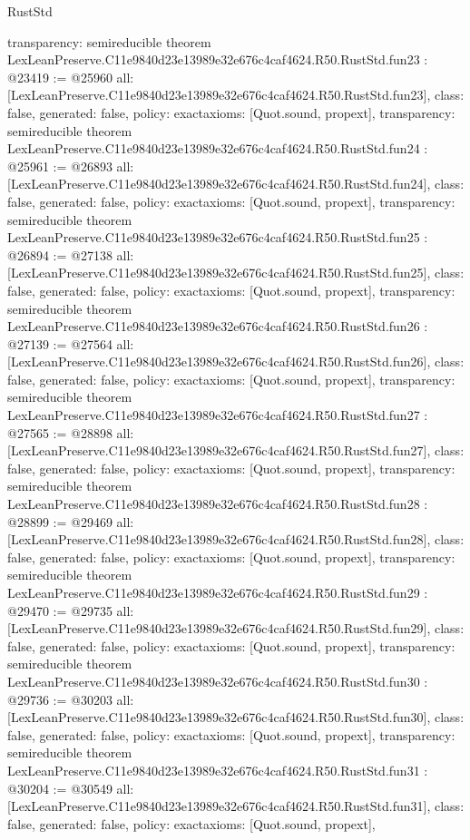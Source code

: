 \begin{lexlean}{RustStd}
\begin{coremodule}
{  transparency: semireducible
}
theorem LexLeanPreserve.C11e9840d23e13989e32e676c4caf4624.R50.RustStd.fun23 : @23419 := @25960 {
  all: [LexLeanPreserve.C11e9840d23e13989e32e676c4caf4624.R50.RustStd.fun23],
  class: false,
  generated: false,
  policy: exact{axioms: [Quot.sound, propext]},
  transparency: semireducible
}
theorem LexLeanPreserve.C11e9840d23e13989e32e676c4caf4624.R50.RustStd.fun24 : @25961 := @26893 {
  all: [LexLeanPreserve.C11e9840d23e13989e32e676c4caf4624.R50.RustStd.fun24],
  class: false,
  generated: false,
  policy: exact{axioms: [Quot.sound, propext]},
  transparency: semireducible
}
theorem LexLeanPreserve.C11e9840d23e13989e32e676c4caf4624.R50.RustStd.fun25 : @26894 := @27138 {
  all: [LexLeanPreserve.C11e9840d23e13989e32e676c4caf4624.R50.RustStd.fun25],
  class: false,
  generated: false,
  policy: exact{axioms: [Quot.sound, propext]},
  transparency: semireducible
}
theorem LexLeanPreserve.C11e9840d23e13989e32e676c4caf4624.R50.RustStd.fun26 : @27139 := @27564 {
  all: [LexLeanPreserve.C11e9840d23e13989e32e676c4caf4624.R50.RustStd.fun26],
  class: false,
  generated: false,
  policy: exact{axioms: [Quot.sound, propext]},
  transparency: semireducible
}
theorem LexLeanPreserve.C11e9840d23e13989e32e676c4caf4624.R50.RustStd.fun27 : @27565 := @28898 {
  all: [LexLeanPreserve.C11e9840d23e13989e32e676c4caf4624.R50.RustStd.fun27],
  class: false,
  generated: false,
  policy: exact{axioms: [Quot.sound, propext]},
  transparency: semireducible
}
theorem LexLeanPreserve.C11e9840d23e13989e32e676c4caf4624.R50.RustStd.fun28 : @28899 := @29469 {
  all: [LexLeanPreserve.C11e9840d23e13989e32e676c4caf4624.R50.RustStd.fun28],
  class: false,
  generated: false,
  policy: exact{axioms: [Quot.sound, propext]},
  transparency: semireducible
}
theorem LexLeanPreserve.C11e9840d23e13989e32e676c4caf4624.R50.RustStd.fun29 : @29470 := @29735 {
  all: [LexLeanPreserve.C11e9840d23e13989e32e676c4caf4624.R50.RustStd.fun29],
  class: false,
  generated: false,
  policy: exact{axioms: [Quot.sound, propext]},
  transparency: semireducible
}
theorem LexLeanPreserve.C11e9840d23e13989e32e676c4caf4624.R50.RustStd.fun30 : @29736 := @30203 {
  all: [LexLeanPreserve.C11e9840d23e13989e32e676c4caf4624.R50.RustStd.fun30],
  class: false,
  generated: false,
  policy: exact{axioms: [Quot.sound, propext]},
  transparency: semireducible
}
theorem LexLeanPreserve.C11e9840d23e13989e32e676c4caf4624.R50.RustStd.fun31 : @30204 := @30549 {
  all: [LexLeanPreserve.C11e9840d23e13989e32e676c4caf4624.R50.RustStd.fun31],
  class: false,
  generated: false,
  policy: exact{axioms: [Quot.sound, propext]},
}
\end{coremodule}
\end{lexlean}
